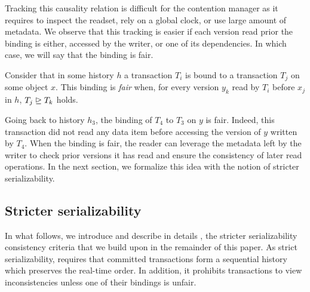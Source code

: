 Tracking this causality relation is difficult for the contention manager as it requires to inspect the readset, rely on a global clock, or use large amount of metadata.
We observe that this tracking is easier if each version read prior the binding is either, accessed by the writer, or one of its dependencies.
In which case, we will say that the binding is fair.

\begin{definition}
  Consider that in some history $h$ a transaction $T_i$ is bound to a transaction $T_j$ on some object $x$.
  This binding is \emph{fair} when, for every version $y_k$ read by $T_i$ before $x_j$ in $h$, $T_j \mathrel{\unrhd} T_k$ holds.
\end{definition}

Going back to history $h_3$, the binding of $T_4$ to $T_3$ on $y$ is fair.
Indeed, this transaction did not read any data item before accessing the version of $y$ written by $T_4$.
When the binding is fair, the reader can leverage the metadata left by the writer to check prior versions it has read and ensure the consistency of later read operations.
In the next section, we formalize this idea with the notion of stricter serializability.

\subsection{Stricter serializability}
In what follows, we introduce and describe in details \SPSER, the stricter serializability consistency criteria that we build upon in the remainder of this paper.
As strict serializability, \SPSER requires that committed transactions form a sequential history which preserves the real-time order.
In addition, it prohibits transactions to view inconsistencies unless one of their bindings is unfair.

